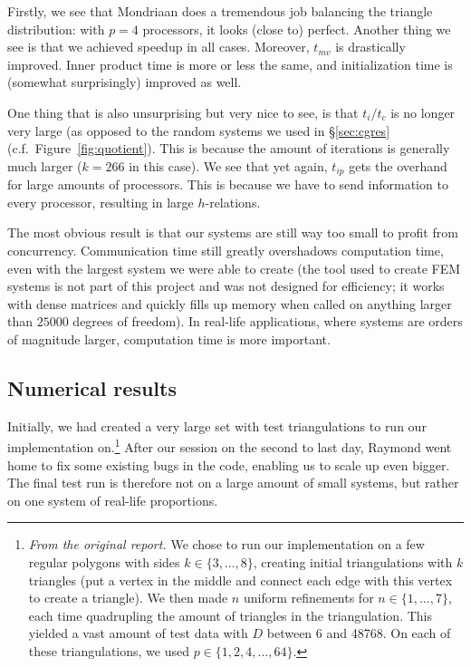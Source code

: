 \documentclass[11pt]{amsart}
\theoremstyle{definition}
\begin{document}
Firstly, we see that Mondriaan does a tremendous job balancing the triangle distribution: with $p=4$ processors, it looks (close to) perfect. Another thing we see is that we achieved speedup in all cases. Moreover, $t_{mv}$ is drastically improved. Inner product time is more or less the same, and initialization time is (somewhat surprisingly) improved as well.

One thing that is also unsurprising but very nice to see, is that $t_i/t_c$ is no longer very large (as opposed to the random systems we used in \S\ref{sec:cgres} (c.f.~Figure~\ref{fig:quotient}). This is because the amount of iterations is generally much larger ($k=266$ in this case). We see that yet again, $t_{ip}$ gets the overhand for large amounts of processors. This is because we have to send information to every processor, resulting in large $h$-relations.

The most obvious result is that our systems are still way too small to profit from concurrency. Communication time still greatly overshadows computation time, even with the largest system we were able to create (the tool used to create FEM systems is not part of this project and was not designed for efficiency; it works with dense matrices and quickly fills up memory when called on anything larger than $25000$ degrees of freedom). In real-life applications, where systems are orders of magnitude larger, computation time is more important.

\subsection{Numerical results}
Initially, we had created a very large set with test triangulations to run our implementation on.\footnote{\emph{From the original report.} We chose to run our implementation on a few regular polygons with sides $k \in \{3, \ldots, 8\}$, creating initial triangulations with $k$ triangles (put a vertex in the middle and connect each edge with this vertex to create a triangle). We then made $n$ uniform refinements for $n \in \{1, \ldots, 7\}$, each time quadrupling the amount of triangles in the triangulation. This yielded a vast amount of test data with $D$ between 6 and 48768. On each of these triangulations, we used $p \in \{1, 2, 4, \ldots, 64\}$.} After our session on the second to last day, Raymond went home to fix some existing bugs in the code, enabling us to scale up even bigger. The final test run is therefore not on a large amount of small systems, but rather on one system of real-life proportions.
\end{document}
